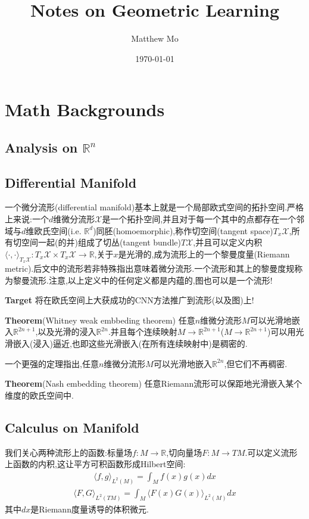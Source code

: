 \documentclass{article}
\title{\textbf{Notes on Geometric Learning}}
\author{Matthew Mo}
\date{\today}
\begin{document}
\maketitle
\section{Math Backgrounds}
\subsection{Analysis on $\mathbb R ^ n$}

\subsection{Differential Manifold}
一个微分流形(differential manifold)基本上就是一个局部欧式空间的拓扑空间.严格上来说:一个$d$维微分流形$\mathcal{X}$是一个拓扑空间,并且对于每一个其中的点都存在一个邻域与$d$维欧氏空间(i.e. $\mathbb{R}^d$)同胚(homoemorphic),称作切空间(tangent space)$T_x\mathcal{X}$,所有切空间一起(的并)组成了切丛(tangent bundle)$T\mathcal{X}$,并且可以定义内积$\langle \cdot, \cdot \rangle_{T_x\mathcal{X}}:T_x\mathcal{X}\times T_x\mathcal{X} \rightarrow \mathbb{R}$,关于$x$是光滑的,成为流形上的一个黎曼度量(Riemann metric).后文中的流形若非特殊指出意味着微分流形.一个流形和其上的黎曼度规称为黎曼流形.注意,以上定义中的任何定义都是内蕴的,图也可以是一个流形!

\textbf{Target} 将在欧氏空间上大获成功的CNN方法推广到流形(以及图)上!

\textbf{Theorem}(Whitney weak embbeding theorem) 任意$n$维微分流形$M$可以光滑地嵌入$\mathbb{R}^{2n+1}$,以及光滑的浸入$\mathbb{R}^{2n}$.并且每个连续映射$M\rightarrow \mathbb{R}^{2n+1}$($M\rightarrow \mathbb{R}^{2n+1}$)可以用光滑嵌入(浸入)逼近,也即这些光滑嵌入(在所有连续映射中)是稠密的.

一个更强的定理指出,任意$n$维微分流形$M$可以光滑地嵌入$\mathbb{R}^{2n}$,但它们不再稠密.

\textbf{Theorem}(Nash embedding theorem) 任意Riemann流形可以保距地光滑嵌入某个维度的欧氏空间中.

\subsection{Calculus on Manifold}
我们关心两种流形上的函数:标量场$f:M\rightarrow \mathbb{R}$,切向量场$F:M\rightarrow TM$.可以定义流形上函数的内积,这让平方可积函数形成Hilbert空间:
\begin{align}\langle f, g\rangle_{L^2(M)}=\int_M f(x)g(x) dx\end{align}
\begin{align}\langle F, G\rangle_{L^2(TM)}=\int_M \langle F(x)G(x) \rangle_{L^2(M)} dx
\end{align}
其中$dx$是Riemann度量诱导的体积微元.
\end{document}
